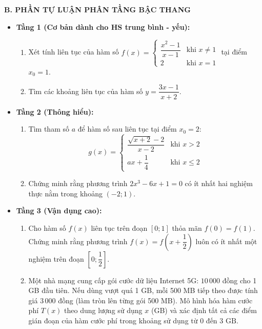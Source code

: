 \documentclass[12pt, a4paper]{article}
\begin{document}
\noindent \textbf{B. PHẦN TỰ LUẬN PHÂN TẦNG BẬC THANG}
\begin{itemize}[leftmargin=0.6cm]
    \item \textbf{Tầng 1 (Cơ bản dành cho HS trung bình - yếu):}
    \begin{enumerate}[leftmargin=0.5cm]
        \item Xét tính liên tục của hàm số $f(x) = \begin{cases} \dfrac{x^2 - 1}{x - 1} & \text{khi } x \neq 1 \\ 2 & \text{khi } x = 1 \end{cases}$ tại điểm $x_0 = 1$.
        \item Tìm các khoảng liên tục của hàm số $y = \dfrac{3x - 1}{x + 2}$.
    \end{enumerate}

    \item \textbf{Tầng 2 (Thông hiểu):}
    \begin{enumerate}[leftmargin=0.5cm]
        \item Tìm tham số $a$ để hàm số sau liên tục tại điểm $x_0 = 2$:
        $$g(x) = \begin{cases} \dfrac{\sqrt{x + 2} - 2}{x - 2} & \text{khi } x > 2 \\ ax + \dfrac{1}{4} & \text{khi } x \le 2 \end{cases}$$
        \item Chứng minh rằng phương trình $2x^3 - 6x + 1 = 0$ có ít nhất hai nghiệm thực nằm trong khoảng $(-2; 1)$.
    \end{enumerate}

    \item \textbf{Tầng 3 (Vận dụng cao):}
    \begin{enumerate}[leftmargin=0.5cm]
        \item Cho hàm số $f(x)$ liên tục trên đoạn $[0; 1]$ thỏa mãn $f(0) = f(1)$. Chứng minh rằng phương trình $f(x) = f\left(x + \dfrac{1}{2}\right)$ luôn có ít nhất một nghiệm trên đoạn $\left[0; \dfrac{1}{2}\right]$.
        \item Một nhà mạng cung cấp gói cước dữ liệu Internet 5G: $10\,000$ đồng cho 1 GB đầu tiên. Nếu dùng vượt quá 1 GB, mỗi 500 MB tiếp theo được tính giá $3\,000$ đồng (làm tròn lên từng gói 500 MB). Mô hình hóa hàm cước phí $T(x)$ theo dung lượng sử dụng $x$ (GB) và xác định tất cả các điểm gián đoạn của hàm cước phí trong khoảng sử dụng từ $0$ đến $3\text{ GB}$.
    \end{enumerate}
\end{itemize}
\end{document}
